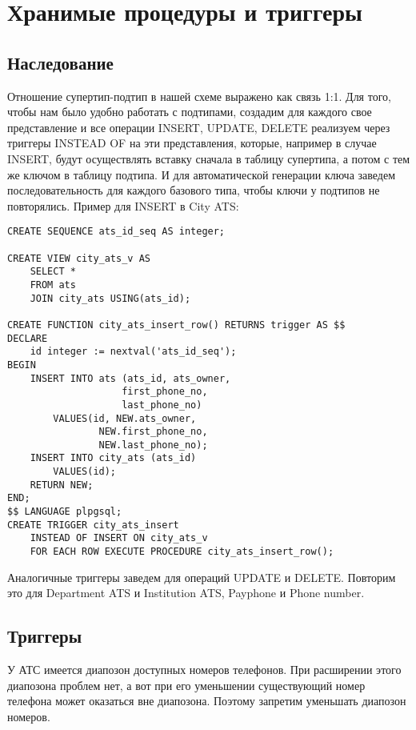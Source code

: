 \documentclass{report}
\begin{document}
\chapter{Хранимые процедуры и триггеры}

\section{Наследование}

Отношение супертип-подтип в нашей схеме выражено как связь 1:1. 
Для того, чтобы нам было удобно работать с подтипами, создадим
для каждого свое представление и все операции INSERT, UPDATE, DELETE
реализуем через триггеры INSTEAD OF на эти представления, которые,
например в случае INSERT, будут осуществлять вставку сначала в 
таблицу супертипа, а потом с тем же ключом в таблицу подтипа.
И для автоматической генерации ключа заведем последовательность 
для каждого базового типа, чтобы ключи у подтипов не повторялись.
Пример для INSERT в City ATS:
\begin{lstlisting}
CREATE SEQUENCE ats_id_seq AS integer;

CREATE VIEW city_ats_v AS
    SELECT *
    FROM ats 
    JOIN city_ats USING(ats_id); 

CREATE FUNCTION city_ats_insert_row() RETURNS trigger AS $$
DECLARE
    id integer := nextval('ats_id_seq');
BEGIN
    INSERT INTO ats (ats_id, ats_owner, 
                    first_phone_no, 
                    last_phone_no)
        VALUES(id, NEW.ats_owner, 
                NEW.first_phone_no, 
                NEW.last_phone_no);
    INSERT INTO city_ats (ats_id)
        VALUES(id);
    RETURN NEW;
END;
$$ LANGUAGE plpgsql;
CREATE TRIGGER city_ats_insert 
    INSTEAD OF INSERT ON city_ats_v
    FOR EACH ROW EXECUTE PROCEDURE city_ats_insert_row();
\end{lstlisting}

Аналогичные триггеры заведем для операций UPDATE и DELETE. 
Повторим это для Department ATS и Institution ATS, 
Payphone и Phone number.

\section{Триггеры}

У АТС имеется диапозон доступных номеров телефонов. При расширении этого 
диапозона проблем нет, а вот при его уменьшении существующий номер 
телефона может оказаться вне диапозона. Поэтому запретим уменьшать 
диапозон номеров.
\end{document}
